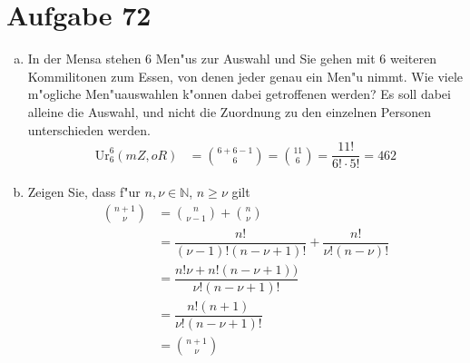 \section{Aufgabe 72}

\begin{enumerate}[(a)]
    \item In der Mensa stehen 6 Men"us zur Auswahl und Sie gehen mit 6 weiteren
        Kommilitonen zum Essen, von denen jeder genau ein Men"u nimmt. Wie
        viele m"ogliche Men"uauswahlen k"onnen dabei getroffenen werden? Es
        soll dabei alleine die Auswahl, und nicht die Zuordnung zu den
        einzelnen Personen unterschieden werden.
        \begin{align*}
            \text{Ur}_6^6(mZ, oR) &= \binom{6 + 6 - 1}{6} = \binom{11}{6} = \dfrac{11!}{6!\cdot5!} = 462
        \end{align*}
    \item Zeigen Sie, dass f"ur $n, \nu \in \mathbb{N}$, $n \geq \nu$ gilt
        \begin{align*}
            \binom{n + 1}{\nu} &= \binom{n}{\nu - 1} + \binom{n}{\nu} \\[5pt]
                               &= \dfrac{n!}{(\nu - 1)!(n - \nu + 1)!} + \dfrac{n!}{\nu!(n - \nu)!} \\[5pt]
                               &= \dfrac{n!\nu + n!(n - \nu + 1))}{\nu!(n - \nu + 1)!} \\[5pt]
                               &= \dfrac{n!(n + 1)}{\nu!(n - \nu + 1)!} \\[5pt]
                               &= \binom{n + 1}{\nu}
        \end{align*}
\end{enumerate}
